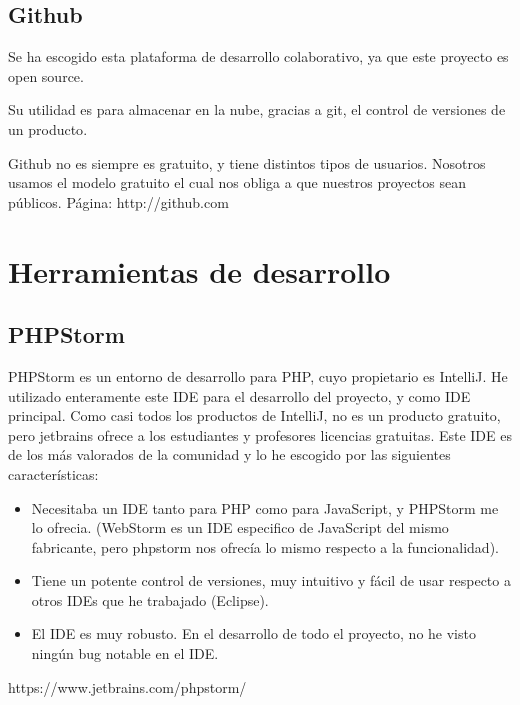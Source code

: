 \subsection{Github}


Se ha escogido esta plataforma de desarrollo colaborativo, ya que este proyecto es open source.

Su utilidad es para almacenar en la nube, gracias a git, el control de versiones de un producto\cite{GITHUB}.

Github no es siempre es gratuito, y tiene distintos tipos de usuarios. Nosotros usamos el modelo gratuito el cual nos obliga a que nuestros proyectos sean públicos.
Página:  http://github.com




\section{Herramientas de desarrollo}


\subsection{PHPStorm}


PHPStorm es un entorno de desarrollo para PHP, cuyo propietario es IntelliJ.\cite{PHPSTORM}
He utilizado enteramente este IDE para el desarrollo del proyecto, y como IDE principal.
Como casi todos los productos de IntelliJ, no es un producto gratuito, pero jetbrains ofrece a los estudiantes y profesores licencias gratuitas.
Este IDE es de los más valorados de la comunidad y lo he escogido por las siguientes características:
\begin{itemize}
	\item Necesitaba un IDE tanto para PHP como para JavaScript, y PHPStorm me lo ofrecia. (WebStorm\cite{WEBSTORM} es un IDE especifico de JavaScript del mismo fabricante, pero phpstorm nos ofrecía lo mismo respecto a la funcionalidad).
	\item Tiene un potente control de versiones, muy intuitivo y fácil de usar respecto a otros IDEs que he trabajado (Eclipse).
	\item El IDE es muy robusto. En el desarrollo de todo el proyecto, no he visto ningún bug notable en el IDE.
\end{itemize}

https://www.jetbrains.com/phpstorm/


